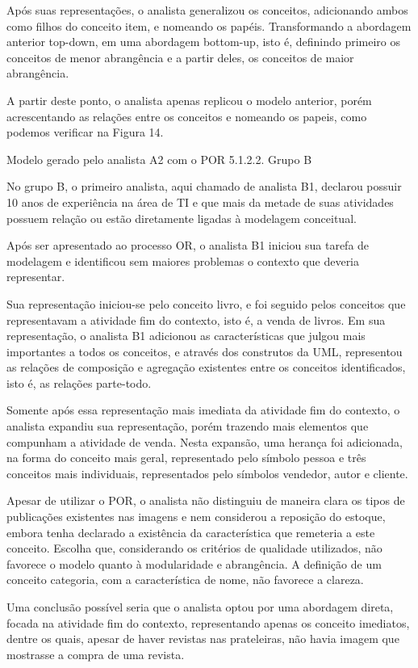 Após suas representações, o analista generalizou os conceitos, adicionando ambos como filhos do conceito item, e nomeando os papéis. Transformando a abordagem anterior top-down, em uma abordagem bottom-up, isto é, definindo primeiro os conceitos de menor abrangência e a partir deles, os conceitos de maior abrangência.

A partir deste ponto, o analista apenas replicou o modelo anterior, porém acrescentando as relações entre os conceitos e nomeando os papeis, como podemos verificar na Figura 14.


Modelo gerado pelo analista A2 com o POR
5.1.2.2. Grupo B

No grupo B, o primeiro analista, aqui chamado de analista B1, declarou possuir 10 anos de experiência na área de TI e que mais da metade de suas atividades possuem relação ou estão diretamente ligadas à modelagem conceitual.

Após ser apresentado ao processo OR, o analista B1 iniciou sua tarefa de modelagem e identificou sem maiores problemas o contexto que deveria representar.

Sua representação iniciou-se pelo conceito livro, e foi seguido pelos conceitos que representavam a atividade fim do contexto, isto é, a venda de livros. Em sua representação, o analista B1 adicionou as características que julgou mais importantes a todos os conceitos, e através dos construtos da UML, representou as relações de composição e agregação existentes entre os conceitos identificados, isto é, as relações parte-todo.

Somente após essa representação mais imediata da atividade fim do contexto, o analista expandiu sua representação, porém trazendo mais elementos que compunham a atividade de venda. Nesta expansão, uma herança foi adicionada, na forma do conceito mais geral, representado pelo símbolo pessoa e três conceitos mais individuais, representados pelo símbolos vendedor, autor e cliente.

Apesar de utilizar o POR, o analista não distinguiu de maneira clara os tipos de publicações existentes nas imagens e nem considerou a reposição do estoque, embora tenha declarado a existência da característica que remeteria a este conceito. Escolha que, considerando os critérios de qualidade utilizados, não favorece o modelo quanto à modularidade e abrangência. A definição de um conceito categoria, com a característica de nome, não favorece a clareza. 

Uma conclusão possível seria que o analista optou por uma abordagem direta, focada na atividade fim do contexto, representando apenas os conceito imediatos, dentre os quais, apesar de haver revistas nas prateleiras, não havia imagem que mostrasse a compra de uma revista.

